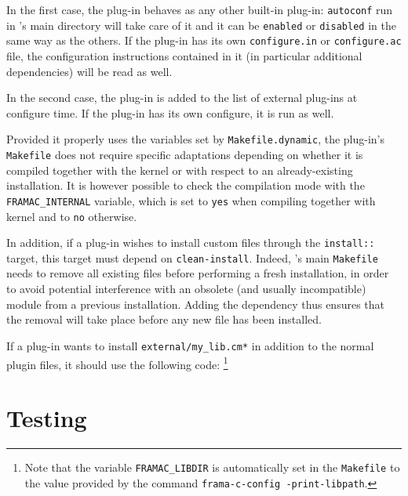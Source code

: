 In the first case, the plug-in behaves as any other built-in plug-in:
\verb+autoconf+ run in \framac's main directory will take care of it
and it can be \verb+enabled+ or \verb+disabled+ in the same way as the
others. If the plug-in has its own \verb+configure.in+ or
\verb+configure.ac+ file, the configuration instructions contained
in it (in particular additional dependencies) will be read as well.

In the second case, the plug-in is added to the list of external
plug-ins at configure time. If the plug-in has its own configure, it
is run as well.

Provided it properly uses the variables set by \texttt{Makefile.dynamic},
the plug-in's \texttt{Makefile} does not require
specific adaptations depending on whether it is compiled together with
the kernel or with respect to an already-existing \framac installation.
It is however possible to check the compilation mode with the
\texttt{FRAMAC\_INTERNAL} variable, which is set to
\texttt{yes} when compiling together with \framac kernel and to \texttt{no}
otherwise.

In addition, if a plug-in wishes to install custom files through the
\texttt{install::} target, this target must depend on \texttt{clean-install}.
Indeed, \framac's main \texttt{Makefile} needs to remove all existing files
before performing a fresh installation, in order to avoid potential interference
with an obsolete (and usually incompatible) module from a previous installation.
Adding the dependency thus ensures that the removal will take place before any
new file has been installed.

\begin{example} If a plug-in wants to install \texttt{external/my\_lib.cm*} in
  addition to the normal plugin files, it should use the following code:
  \footnote{Note that the variable \texttt{FRAMAC\_LIBDIR} is automatically set
    in the \framac \texttt{Makefile} to the value provided by the command
    \texttt{frama-c-config -print-libpath}.}
\end{example} %


\section{Testing}\label{adv:ptests}

